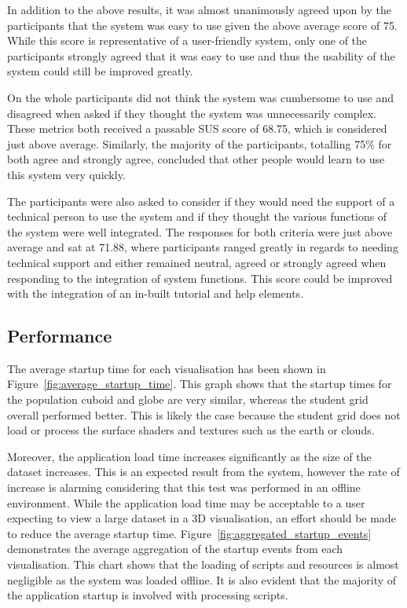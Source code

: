 {{		

		In addition to the above results, it was almost unanimously agreed upon by the participants that the system was easy to use given the above average score of 75. While this score is representative of a user-friendly system, only one of the participants strongly agreed that it was easy to use and thus the usability of the system could still be improved greatly. 

		On the whole participants did not think the system was cumbersome to use and disagreed when asked if they thought the system was unnecessarily complex. These metrics both received a passable SUS score of 68.75, which is considered just above average. Similarly, the majority of the participants, totalling 75\% for both agree and strongly agree, concluded that other people would learn to use this system very quickly.

		The participants were also asked to consider if they would need the support of a technical person to use the system and if they thought the various functions of the system were well integrated. The responses for both criteria were just above average and sat at 71.88, where participants ranged greatly in regards to needing technical support and either remained neutral, agreed or strongly agreed when responding to the integration of system functions. This score could be improved with the integration of an in-built tutorial and help elements.

	}

	\subsection{Performance} {
	\label{sec:performance}

		The average startup time for each visualisation has been shown in Figure~\ref{fig:average_startup_time}. This graph shows that the startup times for the population cuboid and globe are very similar, whereas the student grid overall performed better. This is likely the case because the student grid does not load or process the surface shaders and textures such as the earth or clouds.

		

		Moreover, the application load time increases significantly as the size of the dataset increases. This is an expected result from the system, however the rate of increase is alarming considering that this test was performed in an offline environment. While the application load time may be acceptable to a user expecting to view a large dataset in a 3D visualisation, an effort should be made to reduce the average startup time. Figure~\ref{fig:aggregated_startup_events} demonstrates the average aggregation of the startup events from each visualisation. This chart shows that the loading of scripts and resources is almost negligible as the system was loaded offline. It is also evident that the majority of the application startup is involved with processing scripts.

}}
